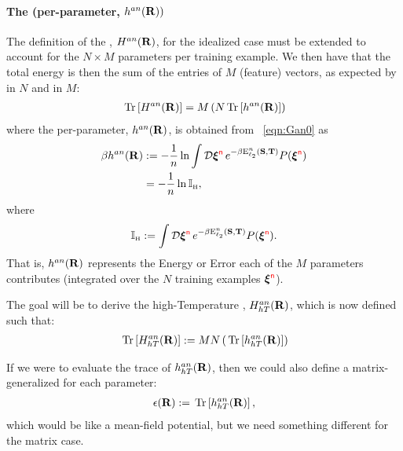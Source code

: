\paragraph{The \AnnealedHamiltonian (per-parameter, $h^{an}(\mathbf{R}))$}
The definition of the \AnnealedHamiltonian, $H^{an}(\mathbf{R})$, for the idealized case must be extended to account for the $N\times M$ parameters per training example.  We then have that the total energy is then the sum of the entries of $M$ (feature) vectors, as expected by 
\SizeExtensivity in $N$ and
\SizeConsistency in $M$:
\begin{align}
 \label{eqn:hanpp}
 \mbox{}\operatorname{Tr}\left[H^{an}(\mathbf{R})\right]=M\left(N\mbox{}\operatorname{Tr}\left[h^{an}(\mathbf{R})\right]\right)
\end{align}
where the \AnnealedHamiltonian per-parameter, $h^{an}(\mathbf{R})$, is obtained from \EQN~\ref{eqn:Gan0} as
\begin{align}
\label{eqn:Gan_lnI}
\beta h^{an}(\mathbf{R})
   &:=-\frac{1}{n}\ln   \int\mathcal{D}\boldsymbol{\xi}^{{\color{red}\sf{n}}} \, e^{-\beta \mathbf{\mathrm{E}}^{n}_{\ell_2}({\mathbf{S}},{\mathbf{T}})} P(\boldsymbol{\xi}^{{\color{red}\sf{n}}}) \\
\nonumber
   &=-\frac{1}{n}\ln \mathbb{I}_{\text{\tiny H}} ,
\end{align}
where
\begin{align}
\label{eqn:InsideGan}
\mathbb{I}_{\text{\tiny H}} := \int\mathcal{D}\boldsymbol{\xi}^{{\color{red}\sf{n}}} \, e^{-\beta \mathbf{\mathrm{E}}^{n}_{\ell_2}({\mathbf{S}},{\mathbf{T}})} P(\boldsymbol{\xi}^{{\color{red}\sf{n}}}) .
\end{align}
That is, $h^{an}(\mathbf{R})$ represents the Energy or Error each of the $M$ parameters contributes
(integrated over the $N$ training examples $\boldsymbol{\xi}^{{\color{red}\sf{n}}}$).

The goal will be to derive the high-Temperature \AnnealedHamiltonian, $H^{an}_{hT}(\mathbf{R})$, which is now  defined such that:
\begin{align}
 \label{eqn:hanpp2}
  \mbox{}\operatorname{Tr}\left[H^{an}_{hT}(\mathbf{R})\right]:=MN\left(\mbox{}\operatorname{Tr}\left[h^{an}_{hT}(\mathbf{R})  \right]\right)
\end{align}

If we were to evaluate the trace of $h^{an}_{hT}(\mathbf{R})$, then we could also define
a matrix-generalized \EffectivePotential for each parameter:
\begin{align}
  \label{eqn:EPSL_mat}
  \epsilon(\mathbf{R}):=\mbox{}\operatorname{Tr}\left[h^{an}_{hT}(\mathbf{R})\right],
\end{align}
which would be like a mean-field potential, but we need something different for the matrix case.


